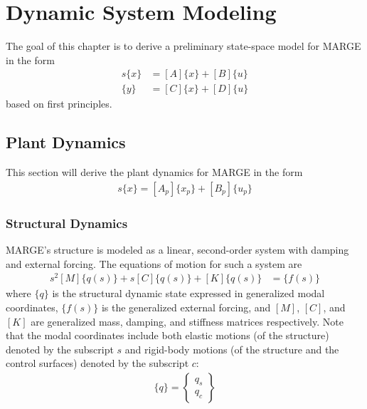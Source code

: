 \chapter{Dynamic System Modeling}
\label{ch:sysModeling}

The goal of this chapter is to derive a preliminary state-space model for MARGE in the form
\begin{equation}
\label{eq:modelingGoal}
	\begin{aligned}
    		s \{x\} &= [A] \{x\} + [B]\{u\} \\
	    \{y\} &= [C] \{x\} + [D] \{u\}
	\end{aligned}
\end{equation}
based on first principles.

\section{Plant Dynamics} %

This section will derive the plant dynamics for MARGE in the form
\begin{align}
	\label{eq:ssPlant}
	s \{x\} = [A_p]\{x_p\}+[B_p]\{u_p\}
\end{align}

\subsection{Structural Dynamics} %

MARGE's structure is modeled as a linear, second-order system with damping and external forcing. The equations of motion for such a system are
\begin{align}
    s^2 [M] \{q(s)\} + s [C] \{q(s)\} + [K] \{q(s)\} &= \{f(s)\}
\end{align}
where $\{q\}$ is the structural dynamic state expressed in generalized modal coordinates, $\{f(s)\}$ is the generalized external forcing, and $[M]$, $[C]$, and $[K]$ are generalized mass, damping, and stiffness matrices respectively. Note that the modal coordinates include both elastic motions (of the structure) denoted by the subscript $s$ and rigid-body motions (of the structure and the control surfaces) denoted by the subscript $c$:
\begin{align}
    \{q\} = \begin{Bmatrix} q_{s} \\ q_{c} \end{Bmatrix}
\end{align}

